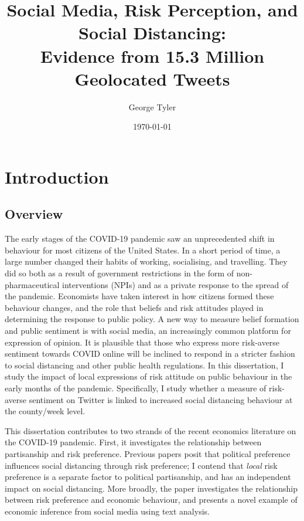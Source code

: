 \documentclass{article}
\author{George Tyler}
\date{\today}
\newcommand\wordcount{}
\begin{document}
\title{Social Media, Risk Perception, and Social Distancing: \\ Evidence from 15.3 Million Geolocated Tweets}

\maketitle

\wordcount

\tableofcontents

\section{Introduction}
\subsection{Overview}
The early stages of the COVID-19 pandemic saw an unprecedented shift in behaviour for most citizens of the United States. In a short period of time, a large number changed their habits of working, socialising, and travelling. They did so both as a result of government restrictions in the form of non-pharmaceutical interventions (NPIs) and as a private response to the spread of the pandemic. Economists have taken interest in how citizens formed these behaviour changes, and the role that beliefs and risk attitudes played in determining the response to public policy. A new way to measure belief formation and public sentiment is with social media, an increasingly common platform for expression of opinion. It is plausible that those who express more risk-averse sentiment towards COVID online will be inclined to respond in a stricter fashion to social distancing and other public health regulations. In this dissertation, I study the impact of local expressions of risk attitude on public behaviour in the early months of the pandemic. Specifically, I study whether a measure of risk-averse sentiment on Twitter is linked to increased social distancing behaviour at the county/week level. 

This dissertation contributes to two strands of the recent economics literature on the COVID-19 pandemic. First, it investigates the relationship between partisanship and risk preference. Previous papers posit that political preference influences social distancing through risk preference; I contend that \textit{local} risk preference is a separate factor to political partisanship, and has an independent impact on social distancing. More broadly, the paper investigates the relationship between risk preference and economic behaviour, and presents a novel example of economic inference from social media using text analysis. 
\end{document}
